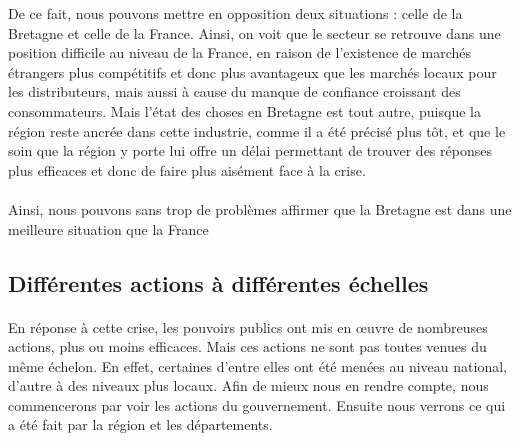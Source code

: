 \documentclass[a4paper,12pt]{report}
\begin{document}
			De ce fait, nous pouvons mettre en opposition deux situations : celle de la Bretagne et celle de la France. Ainsi, on voit que le secteur se retrouve dans une position difficile au niveau de la France, en raison de l’existence de marchés étrangers plus compétitifs et donc plus avantageux que les marchés locaux pour les distributeurs, mais aussi à cause du manque de confiance croissant des consommateurs. Mais l’état des choses en Bretagne est tout autre, puisque la région reste ancrée dans cette industrie, comme il a été précisé plus tôt, et que le soin que la région y porte lui offre un délai permettant de trouver des réponses plus efficaces et donc de faire plus aisément face à la crise.

			\paragraph{}Ainsi, nous pouvons sans trop de problèmes affirmer que la Bretagne est dans une meilleure situation que la France
			
		\subsection{Différentes actions à différentes échelles}
			\paragraph{}En réponse à cette crise, les pouvoirs publics ont mis en œuvre de nombreuses actions, plus ou moins efficaces. Mais ces actions ne sont pas toutes venues du même échelon. En effet, certaines d'entre elles ont été menées au niveau national, d'autre à des niveaux plus locaux. Afin de mieux nous en rendre compte, nous commencerons par voir les actions du gouvernement. Ensuite nous verrons ce qui a été fait par la région et les départements.
\end{document}
